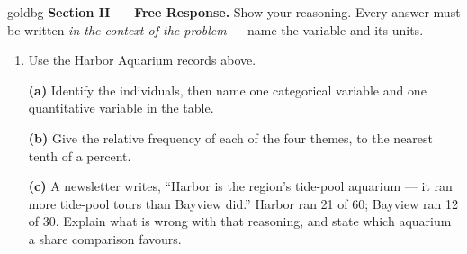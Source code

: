 \documentclass[12pt]{article}
\begin{document}
\begin{enumerate}[leftmargin=1.9em, itemsep=0.13in]
\end{enumerate}

\vspace{0.14in}

\boxguard[18]
\begin{headlinebox}{goldbg}
\small
\textbf{Section II --- Free Response.} Show your reasoning. Every answer must be written
\emph{in the context of the problem} --- name the variable and its units.
\end{headlinebox}

\vspace{0.10in}

\begin{enumerate}[leftmargin=1.9em, itemsep=0.16in, resume]

  \boxguard[16]
  \item Use the Harbor Aquarium records above.

        \vspace{6pt}
        \textbf{(a)} Identify the individuals, then name one categorical variable and one
        quantitative variable in the table.\\[4pt]

        \boxguard[15]
        \vspace{6pt}
        \textbf{(b)} Give the relative frequency of each of the four themes, to the nearest tenth
        of a percent.\\[4pt]

        \boxguard[15]
        \vspace{6pt}
        \textbf{(c)} A newsletter writes, ``Harbor is the region's tide-pool aquarium --- it ran
        more tide-pool tours than Bayview did.'' Harbor ran 21 of 60; Bayview ran 12 of 30.
        Explain what is wrong with that reasoning, and state which aquarium a share comparison
        favours.\\[4pt]


\end{enumerate}
\end{document}
